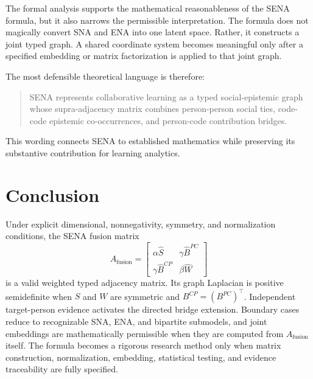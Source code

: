 \documentclass[11pt]{article}
\theoremstyle{definition}
\newcommand{\Af}{A_{\mathrm{fusion}}}
\newcommand{\Shat}{\widehat S}
\newcommand{\What}{\widehat W}
\newcommand{\Bpchat}{\widehat B^{PC}}
\newcommand{\Bcphat}{\widehat B^{CP}}
\begin{document}
The formal analysis supports the mathematical reasonableness of the SENA
formula, but it also narrows the permissible interpretation. The formula does
not magically convert SNA and ENA into one latent space. Rather, it constructs a
joint typed graph. A shared coordinate system becomes meaningful only after a
specified embedding or matrix factorization is applied to that joint graph.

The most defensible theoretical language is therefore:
\begin{quote}
SENA represents collaborative learning as a typed social-epistemic graph whose
supra-adjacency matrix combines person-person social ties, code-code epistemic
co-occurrences, and person-code contribution bridges.
\end{quote}

This wording connects SENA to established mathematics while preserving its
substantive contribution for learning analytics.

\section{Conclusion}

Under explicit dimensional, nonnegativity, symmetry, and normalization
conditions, the SENA fusion matrix
\[
\Af =
\begin{bmatrix}
\alpha\Shat & \gamma\Bpchat\\
\gamma\Bcphat & \beta\What
\end{bmatrix}
\]
is a valid weighted typed adjacency matrix. Its graph Laplacian is positive
semidefinite when \(S\) and \(W\) are symmetric and
\(B^{CP}=(B^{PC})^\top\). Independent target-person evidence activates the
directed bridge extension. Boundary cases reduce to recognizable SNA,
ENA, and bipartite submodels, and joint embeddings are mathematically
permissible when they are computed from \(\Af\) itself. The formula becomes a
rigorous research method only when matrix construction, normalization,
embedding, statistical testing, and evidence traceability are fully specified.
\end{document}

